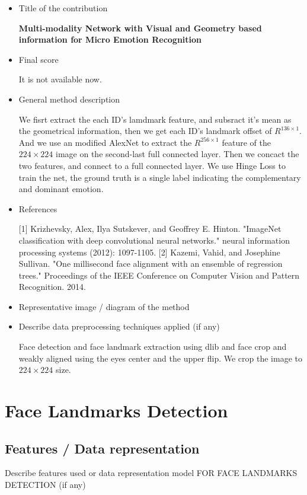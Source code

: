 \documentclass{article}
\begin{document}
\begin{itemize}
\item Title of the contribution

\textbf{Multi-modality Network with Visual and Geometry based information for Micro Emotion Recognition}

\item Final score

It is not available now.

\item General method description

We fisrt extract the each ID's lamdmark feature, and subsract it's mean as the geometrical information, then we get each ID's landmark offset of $R^{136\times1}$. And we use an modified AlexNet to extract the $R^{256\times1}$ feature of the $224\times224$ image on the second-last full connected layer. Then we concact the two features, and connect to a full connected layer. We use Hinge Loss to train the net, the ground truth is a single label indicating the complementary and dominant emotion.

\item References

[1] Krizhevsky, Alex, Ilya Sutskever, and Geoffrey E. Hinton. "ImageNet classification with deep convolutional neural networks." neural information processing systems (2012): 1097-1105.
[2] Kazemi, Vahid, and Josephine Sullivan. "One millisecond face alignment with an ensemble of regression trees." Proceedings of the IEEE Conference on Computer Vision and Pattern Recognition. 2014.

\item Representative image / diagram of the method


\item Describe data preprocessing techniques applied (if any)

Face detection and face landmark extraction using dlib and face crop and weakly aligned using the eyes center and the upper flip. We crop the image to $224 \times 224$ size.

\end{itemize}


\section{Face Landmarks Detection}
\subsection{Features / Data representation}
Describe features used or data representation model FOR FACE LANDMARKS DETECTION (if any)
\end{document}
